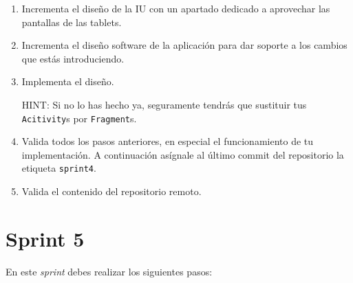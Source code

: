 \documentclass[11pt,a4paper]{article}
\begin{document}
\begin{enumerate}
\item Incrementa el diseño de la IU con un apartado dedicado a
  aprovechar las pantallas de las tablets.

\item Incrementa el diseño software de la aplicación para dar soporte
  a los cambios que estás introduciendo.

\item Implementa el diseño.

  HINT: Si no lo has hecho ya, seguramente tendrás que sustituir tus
  \texttt{Acitivity}s por \texttt{Fragment}s.

\item Valida todos los pasos anteriores, en especial el funcionamiento
  de tu implementación. A continuación asígnale al último commit del
  repositorio la etiqueta \texttt{sprint4}.

\item Valida el contenido del repositorio remoto.
\end{enumerate}





\section{Sprint 5}


En este \emph{sprint} debes realizar los siguientes pasos:
\end{document}
